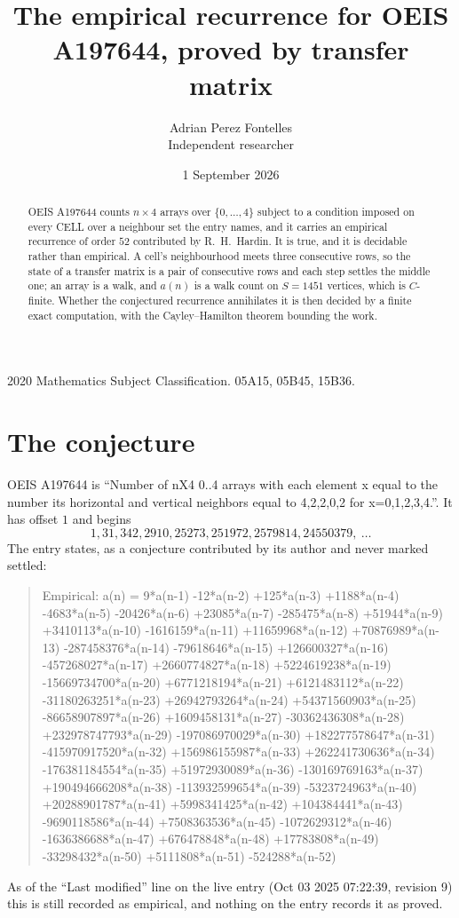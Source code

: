 \documentclass[11pt,a4paper]{article}
\title{The empirical recurrence for OEIS A197644, proved by transfer matrix}
\author{Adrian Perez Fontelles\\ \small Independent researcher}
\date{1 September 2026}
\theoremstyle{plain}
\theoremstyle{definition}
\begin{document}
\maketitle

\begin{abstract}
OEIS A197644 counts $n\times4$ arrays over $\{0,\dots,4\}$ subject to a condition imposed on
every CELL over a neighbour set the entry names, and it carries an empirical recurrence of
order $52$ contributed by R.~H.~Hardin. It is true, and it is decidable rather than
empirical. A cell's neighbourhood meets three consecutive rows, so the state of a transfer
matrix is a pair of consecutive rows and each step settles the middle one; an array is a
walk, and $a(n)$ is a walk count on $S=1451$ vertices, which is $C$-finite. Whether the
conjectured recurrence annihilates it is then decided by a finite exact computation, with the
Cayley--Hamilton theorem bounding the work.
\end{abstract}

\noindent\small 2020 Mathematics Subject Classification. 05A15, 05B45, 15B36.\normalsize

\section{The conjecture}

OEIS A197644 is ``Number of nX4 0..4 arrays with each element x equal to the number its horizontal and vertical neighbors equal to 4,2,2,0,2 for x=0,1,2,3,4.''. It has offset $1$ and begins
\[
1, 31, 342, 2910, 25273, 251972, 2579814, 24550379,\ \dots
\]
The entry states, as a conjecture contributed by its author and never marked settled:
\begin{quote}
Empirical: a(n) = 9*a(n-1) -12*a(n-2) +125*a(n-3) +1188*a(n-4) -4683*a(n-5) -20426*a(n-6) +23085*a(n-7) -285475*a(n-8) +51944*a(n-9) +3410113*a(n-10) -1616159*a(n-11) +11659968*a(n-12) +70876989*a(n-13) -287458376*a(n-14) -79618646*a(n-15) +126600327*a(n-16) -457268027*a(n-17) +2660774827*a(n-18) +5224619238*a(n-19) -15669734700*a(n-20) +6771218194*a(n-21) +6121483112*a(n-22) -31180263251*a(n-23) +26942793264*a(n-24) +54371560903*a(n-25) -86658907897*a(n-26) +1609458131*a(n-27) -30362436308*a(n-28) +232978747793*a(n-29) -197086970029*a(n-30) +182277578647*a(n-31) -415970917520*a(n-32) +156986155987*a(n-33) +262241730636*a(n-34) -176381184554*a(n-35) +51972930089*a(n-36) -130169769163*a(n-37) +190494666208*a(n-38) -113932599654*a(n-39) -5323724963*a(n-40) +20288901787*a(n-41) +5998341425*a(n-42) +104384441*a(n-43) -9690118586*a(n-44) +7508363536*a(n-45) -1072629312*a(n-46) -1636386688*a(n-47) +676478848*a(n-48) +17783808*a(n-49) -33298432*a(n-50) +5111808*a(n-51) -524288*a(n-52)
\end{quote}
As of the ``Last modified'' line on the live entry (Oct 03 2025 07:22:39, revision 9) this is still
recorded as empirical, and nothing on the entry records it as proved.
\end{document}
